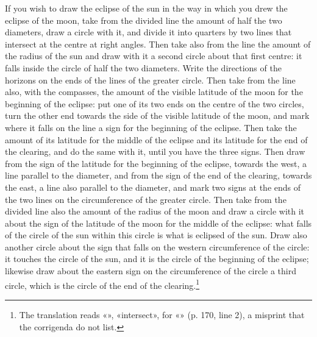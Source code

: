 \documentclass[11pt]{article}
\newcommand{\ArPage}[1]{\marginpar{\footnotesize\color{gray}Ar.\,p.\,#1}}
\begin{document}
\par \ArPage{170}If you wish to draw the eclipse of the sun in the way in which you drew the eclipse of the moon, take from the divided line the amount of half the two diameters, draw a circle with it, and divide it into quarters by two lines that intersect at the centre at right angles. Then take also from the line the amount of the radius of the sun and draw with it a second circle about that first centre: it falls inside the circle of half the two diameters. Write the directions of the horizons on the ends of the lines of the greater circle. Then take from the line also, with the compasses, the amount of the visible latitude of the moon for the beginning of the eclipse: put one of its two ends on the centre of the two circles, turn the other end towards the side of the visible latitude of the moon, and mark where it falls on the line a sign for the beginning of the eclipse. Then take the amount of its latitude for the middle of the eclipse and its latitude for the end of the clearing, and do the same with it, until you have the three signs. Then draw from the sign of the latitude for the beginning of the eclipse, towards the west, a line parallel to the diameter, and from the sign of the end of the clearing, towards the east, a line also parallel to the diameter, and mark two signs at the ends of the two lines on the circumference of the greater circle. Then take from the divided line also the amount of the radius of the moon and draw a circle with it about the sign of the latitude of the moon for the middle of the eclipse: what falls of the circle of the sun within this circle is what is eclipsed of the sun. Draw also another circle about the sign that falls on the western circumference of the circle: it touches the circle of the sun, and it is the circle of the beginning of the eclipse; likewise draw about the eastern sign on the circumference of the circle a third circle, which is the circle of the end of the clearing.\footnote{The translation reads «», «intersect», for «» (p. 170, line 2), a misprint that the corrigenda do not list.}\par
\end{document}
